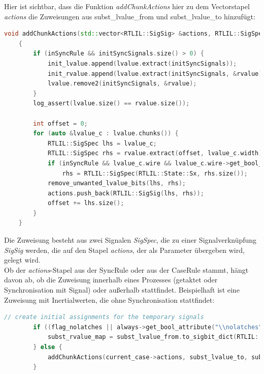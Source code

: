 \documentclass[11pt]{report}
\begin{document}
Hier ist sichtbar, dass die Funktion \textit{addChunkActions} hier zu dem Vectorstapel \textit{actions} die Zuweisungen aus subst\_lvalue\_from und subst\_lvalue\_to hinzufügt:
\begin{lstlisting}[language=C++]
void addChunkActions(std::vector<RTLIL::SigSig> &actions, RTLIL::SigSpec lvalue, RTLIL::SigSpec rvalue, bool inSyncRule = false)
	{
		if (inSyncRule && initSyncSignals.size() > 0) {
			init_lvalue.append(lvalue.extract(initSyncSignals));
			init_rvalue.append(lvalue.extract(initSyncSignals, &rvalue));
			lvalue.remove2(initSyncSignals, &rvalue);
		}
		log_assert(lvalue.size() == rvalue.size());

		int offset = 0;
		for (auto &lvalue_c : lvalue.chunks()) {
			RTLIL::SigSpec lhs = lvalue_c;
			RTLIL::SigSpec rhs = rvalue.extract(offset, lvalue_c.width);
			if (inSyncRule && lvalue_c.wire && lvalue_c.wire->get_bool_attribute("\\nosync"))
				rhs = RTLIL::SigSpec(RTLIL::State::Sx, rhs.size());
			remove_unwanted_lvalue_bits(lhs, rhs);
			actions.push_back(RTLIL::SigSig(lhs, rhs));
			offset += lhs.size();
		}
	}

\end{lstlisting}

Die Zuweisung besteht aus zwei Signalen \textit{SigSpec}, die zu einer Signalverknüpfung \textit{SigSig} werden, die auf den Stapel \textit{actions}, der als Parameter übergeben wird, gelegt wird.\\
Ob der \textit{actions}-Stapel aus der SyncRule oder aus der CaseRule stammt, hängt davon ab, ob die Zuweisung innerhalb eines Prozesses (getaktet oder Synchronisation mit Signal) oder außerhalb stattfindet.
Beispielhaft ist eine Zuweisung mit Inertialwerten, die ohne Synchronisation stattfindet:
\begin{lstlisting}[language=C++]
// create initial assignments for the temporary signals
		if ((flag_nolatches || always->get_bool_attribute("\\nolatches") || current_module->get_bool_attribute("\\nolatches")) && !found_clocked_sync) {
			subst_rvalue_map = subst_lvalue_from.to_sigbit_dict(RTLIL::SigSpec(RTLIL::State::Sx, GetSize(subst_lvalue_from)));
		} else {
			addChunkActions(current_case->actions, subst_lvalue_to, subst_lvalue_from);
		}
\end{lstlisting}
\end{document}
